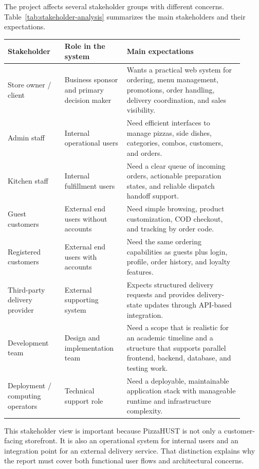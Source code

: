 The project affects several stakeholder groups with different concerns. Table~\ref{tab:stakeholder-analysis} summarizes the main stakeholders and their expectations.

\begingroup
\small
\setlength{\LTpre}{0.4em}
\setlength{\LTpost}{0.8em}
\label{tab:stakeholder-analysis}
\begin{tabular}{L{0.22\linewidth} L{0.24\linewidth} L{0.45\linewidth}}
\toprule
\textbf{Stakeholder} & \textbf{Role in the system} & \textbf{Main expectations} \\
\midrule
Store owner / client & Business sponsor and primary decision maker & Wants a practical web system for ordering, menu management, promotions, order handling, delivery coordination, and sales visibility. \\
Admin staff & Internal operational users & Need efficient interfaces to manage pizzas, side dishes, categories, combos, customers, and orders. \\
Kitchen staff & Internal fulfillment users & Need a clear queue of incoming orders, actionable preparation states, and reliable dispatch handoff support. \\
Guest customers & External end users without accounts & Need simple browsing, product customization, COD checkout, and tracking by order code. \\
Registered customers & External end users with accounts & Need the same ordering capabilities as guests plus login, profile, order history, and loyalty features. \\
Third-party delivery provider & External supporting system & Expects structured delivery requests and provides delivery-state updates through API-based integration. \\
Development team & Design and implementation team & Need a scope that is realistic for an academic timeline and a structure that supports parallel frontend, backend, database, and testing work. \\
Deployment / computing operators & Technical support role & Need a deployable, maintainable application stack with manageable runtime and infrastructure complexity. \\
\bottomrule
\end{tabular}
\endgroup

This stakeholder view is important because PizzaHUST is not only a customer-facing storefront. It is also an operational system for internal users and an integration point for an external delivery service. That distinction explains why the report must cover both functional user flows and architectural concerns.

